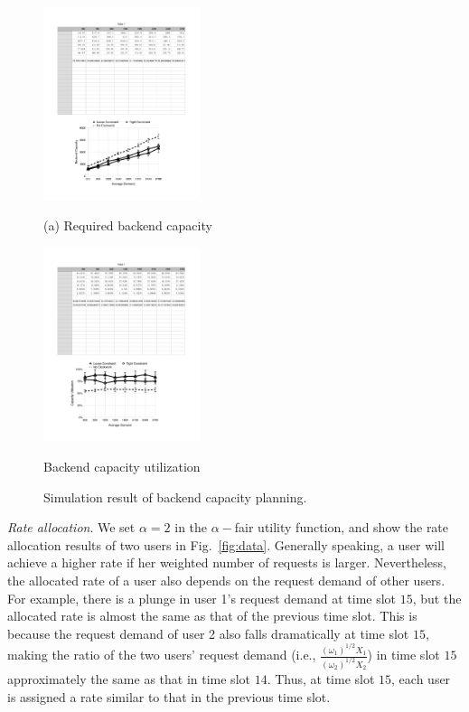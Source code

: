  \begin{figure}[t]
	\centering
	\hspace{-0.5cm}
	\begin{minipage}[t]{1.8in}
		\centering
		\includegraphics[trim=0mm 0mm 0mm 0mm, clip,width=1.8in]{figs/cp}\\
		\centerline{\small{(a) Required backend capacity}}
	\end{minipage}
	\hspace{-0.2cm}
	\begin{minipage}[t]{1.8in}
		\centering
		\includegraphics[trim=0mm 0mm 0mm 0mm, clip,width=1.8in]{figs/up}\\
		\centerline{\small{Backend capacity utilization}}
	\end{minipage}
	\caption{Simulation result of backend capacity planning.} \label{fig:serviceplan}
	\vspace{-1cm}
\end{figure}

\emph{Rate allocation}. We set $\alpha = 2$ in the $\alpha-$fair utility function, and show the rate allocation results of two users in Fig.~\ref{fig:data}. Generally speaking, a user will achieve a higher rate if her weighted number of requests is larger. Nevertheless, the allocated rate of a user also depends on the request demand of other users. For example, there is a plunge in user 1's request demand at time slot $15$, but the allocated rate is almost the same as that of the previous time slot. This is because the request demand of user 2 also falls dramatically at time slot $15$, making the ratio of the two users' request demand (i.e., $\frac{(\omega_1)^{1/2} X_1}{(\omega_2)^{1/2} X_2}$) in time slot $15$ approximately the same as that in time slot $14$. Thus, at time slot $15$, each user is assigned a rate similar to that in the previous time slot.

